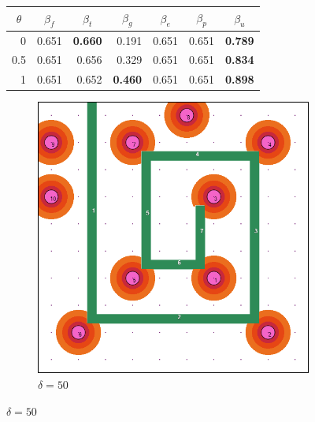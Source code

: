 \documentclass[letterpaper, 10 pt, conference]{ieeeconf}
\begin{document}
\begin{figure}[!h]
\begin{minipage}{\columnwidth}
{\begin{tabular}{|rrrrrrr|}
\multicolumn{1}{|c|}{$\theta$} & \multicolumn{1}{c|}{$\beta_f$} & \multicolumn{1}{c|}{$\beta_t$} & \multicolumn{1}{c|}{$\beta_g$} & \multicolumn{1}{c|}{$\beta_e$} & \multicolumn{1}{c|}{$\beta_p$} & \multicolumn{1}{c|}{$\beta_u$} \\ \hline
\multicolumn{1}{|r|}{0} & \multicolumn{1}{r|}{0.651} & \multicolumn{1}{r|}{\textbf{0.660}} & \multicolumn{1}{r|}{0.191} & \multicolumn{1}{r|}{0.651} & \multicolumn{1}{r|}{0.651} & \textbf{0.789} \\ \hline
\multicolumn{1}{|r|}{0.5} & \multicolumn{1}{r|}{0.651} & \multicolumn{1}{r|}{0.656} & \multicolumn{1}{r|}{0.329} & \multicolumn{1}{r|}{0.651} & \multicolumn{1}{r|}{0.651} & \textbf{0.834} \\ \hline
\multicolumn{1}{|r|}{1} & \multicolumn{1}{r|}{0.651} & \multicolumn{1}{r|}{0.652} & \multicolumn{1}{r|}{\textbf{0.460}} & \multicolumn{1}{r|}{0.651} & \multicolumn{1}{r|}{0.651} & \textbf{0.898} \\ \hline
\end{tabular}%
}
\vspace{3mm}
\end{minipage}
\centering
\begin{subfigure}[t]{0.3\columnwidth}
    \centering
    \includegraphics[width=\columnwidth]{Figures/MazeRange50.png}
    \caption{$\delta = 50$}
\end{subfigure}%

\end{figure}
\end{document}
